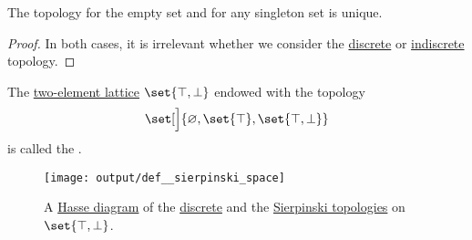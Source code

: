 \begin{proposition}\label{thm:empty_set_discrete_and_indiscrete_topologies}
  The topology for the empty set and for any singleton set is unique.
\end{proposition}
\begin{proof}
  In both cases, it is irrelevant whether we consider the \hyperref[def:discrete_topology]{discrete} or \hyperref[def:indiscrete_topology]{indiscrete} topology.
\end{proof}

\begin{definition}\label{def:sierpinski_space}
  The \hyperref[thm:two_element_lattice]{two-element lattice} \( \set{ \top, \bot } \) endowed with the topology
  \begin{equation*}
    \set[\Big]{ \varnothing, \set{ \top }, \set{ \top, \bot } }
  \end{equation*}
  is called the .

  \begin{figure}[!ht]
    \hfill
    \texttt{[image: output/def\_\_sierpinski\_space]}
    \hfill\hfill
    \caption{A \hyperref[def:hasse_diagram]{Hasse diagram} of the \hyperref[def:discrete_topology]{discrete} and the \hyperref[def:sierpinski_space]{Sierpinski topologies} on \( \set{ \top, \bot } \). }
    \label{fig:def:sierpinski_space}
  \end{figure}
\end{definition}


